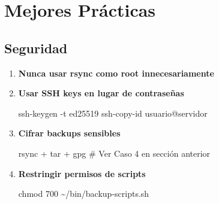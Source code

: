\documentclass[
  doc,
  floatsintext,
  longtable,
  a4paper,
  nolmodern,
  notxfonts,
  notimes,
  12pt,
  colorlinks=true,linkcolor=blue,citecolor=blue,urlcolor=blue]{apa7}
\newenvironment{Shaded}{\begin{snugshade}}{\end{snugshade}}
\newcommand{\AttributeTok}[1]{\textcolor[rgb]{0.40,0.45,0.13}{#1}}
\newcommand{\CommentTok}[1]{\textcolor[rgb]{0.37,0.37,0.37}{#1}}
\newcommand{\ExtensionTok}[1]{\textcolor[rgb]{0.00,0.23,0.31}{#1}}
\newcommand{\FunctionTok}[1]{\textcolor[rgb]{0.28,0.35,0.67}{#1}}
\newcommand{\NormalTok}[1]{\textcolor[rgb]{0.00,0.23,0.31}{#1}}
\newcommand{\VariableTok}[1]{\textcolor[rgb]{0.07,0.07,0.07}{#1}}
\begin{document}
\section{Mejores Prácticas}\label{mejores-pruxe1cticas}

\subsection{Seguridad}\label{seguridad}

\begin{enumerate}
\def\labelenumi{\arabic{enumi}.}
\item
  \textbf{Nunca usar rsync como root innecesariamente}

\begin{Shaded}
\end{Shaded}
\item
  \textbf{Usar SSH keys en lugar de contraseñas}

\begin{Shaded}
\begin{Highlighting}[]
\FunctionTok{ssh{-}keygen} \AttributeTok{{-}t}\NormalTok{ ed25519}
\ExtensionTok{ssh{-}copy{-}id}\NormalTok{ usuario@servidor}
\end{Highlighting}
\end{Shaded}
\item
  \textbf{Cifrar backups sensibles}

\begin{Shaded}
\begin{Highlighting}[]
\FunctionTok{rsync}\NormalTok{ + tar + gpg}
\CommentTok{\# Ver Caso 4 en sección anterior}
\end{Highlighting}
\end{Shaded}
\item
  \textbf{Restringir permisos de scripts}

\begin{Shaded}
\begin{Highlighting}[]
\FunctionTok{chmod}\NormalTok{ 700 \textasciitilde{}/bin/backup{-}scripts.sh}
\end{Highlighting}
\end{Shaded}
\end{enumerate}
\end{document}
